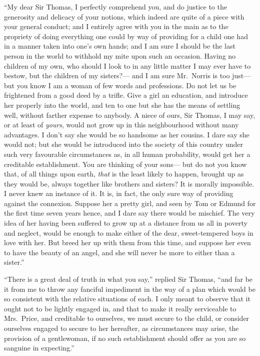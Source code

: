 ``My dear Sir Thomas, I perfectly comprehend you, and do
justice to the generosity and delicacy of your notions,
which indeed are quite of a piece with your general conduct;
and I entirely agree with you in the main as to the propriety
of doing everything one could by way of providing for a
child one had in a manner taken into one's own hands;
and I am sure I should be the last person in the world to
withhold my mite upon such an occasion.  Having no children
of my own, who should I look to in any little matter I
may ever have to bestow, but the children of my sisters?---%
and I am sure Mr.\ Norris is too just---but you know I am
a woman of few words and professions.  Do not let us
be frightened from a good deed by a trifle.  Give a girl
an education, and introduce her properly into the world,
and ten to one but she has the means of settling well,
without farther expense to anybody.  A niece of ours,
Sir Thomas, I may say, or at least of \emph{yours}, would not
grow up in this neighbourhood without many advantages.
I don't say she would be so handsome as her cousins.
I dare say she would not; but she would be introduced into
the society of this country under such very favourable
circumstances as, in all human probability, would get her
a creditable establishment.  You are thinking of your sons---%
but do not you know that, of all things upon earth,
\emph{that} is the least likely to happen, brought up as they
would be, always together like brothers and sisters?
It is morally impossible.  I never knew an instance of it.
It is, in fact, the only sure way of providing against
the connexion.  Suppose her a pretty girl, and seen by Tom
or Edmund for the first time seven years hence, and I dare
say there would be mischief.  The very idea of her having
been suffered to grow up at a distance from us all in poverty
and neglect, would be enough to make either of the dear,
sweet-tempered boys in love with her.  But breed her up
with them from this time, and suppose her even to have the
beauty of an angel, and she will never be more to either than
a sister.''

``There is a great deal of truth in what you say,''
replied Sir Thomas, ``and far be it from me to throw any
fanciful impediment in the way of a plan which would be
so consistent with the relative situations of each.  I only
meant to observe that it ought not to be lightly engaged in,
and that to make it really serviceable to Mrs.\ Price,
and creditable to ourselves, we must secure to the child,
or consider ourselves engaged to secure to her hereafter,
as circumstances may arise, the provision of a gentlewoman,
if no such establishment should offer as you are so sanguine
in expecting.''

